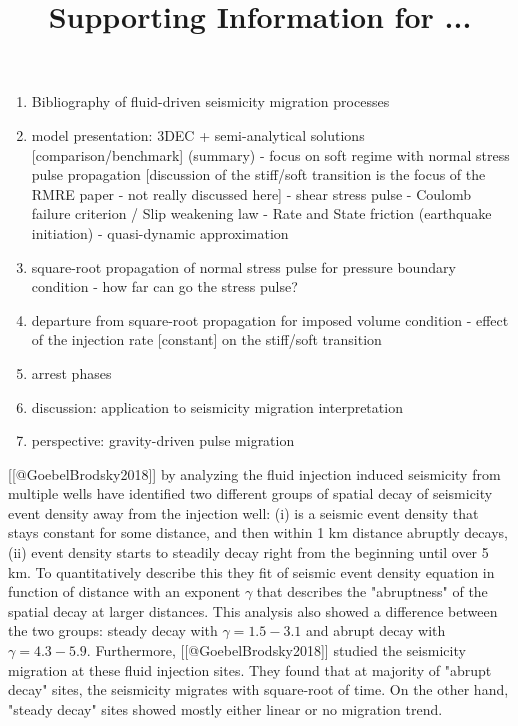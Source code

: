 \documentclass[draft,jgrga]{agutexSI2019}
\begin{document}
\title{Supporting Information for ...}

\authors{}










%
%



\begin{article}

\begin{enumerate}

        \item Bibliography of fluid-driven seismicity migration processes
    \item model presentation: 3DEC + semi-analytical solutions [comparison/benchmark] (summary) - focus on soft regime with normal stress pulse propagation [discussion of the stiff/soft transition is the focus of the RMRE paper - not really discussed here] - shear stress pulse -  Coulomb failure criterion / Slip weakening law - Rate and State friction (earthquake initiation) - quasi-dynamic approximation 
    \item square-root propagation of normal stress pulse for pressure boundary condition - how far can go the stress pulse?
    \item departure from square-root propagation for imposed volume condition - effect of the injection rate [constant] on the stiff/soft transition
    \item arrest phases
    \item discussion: application to seismicity migration interpretation
    \item perspective: gravity-driven pulse migration
\end{enumerate}


[[@GoebelBrodsky2018]] by analyzing the fluid injection induced seismicity from multiple wells have identified two different groups of spatial decay of seismicity event density away from the injection well: (i) is a seismic event density that stays constant for some distance, and then within 1 km distance abruptly decays, (ii) event density starts to steadily decay right from the beginning until over 5 km. To quantitatively describe this they fit of seismic event density equation in function of distance with an exponent $\gamma$ that describes the "abruptness" of the spatial decay at larger distances. This analysis also showed a difference between the two groups: steady decay with $\gamma=1.5-3.1$ and abrupt decay with $\gamma=4.3-5.9$. Furthermore, [[@GoebelBrodsky2018]] studied the seismicity migration at these fluid injection sites. They found that at majority of "abrupt decay" sites, the seismicity migrates with square-root of time. On the other hand, "steady decay" sites showed mostly either linear or no migration trend. 


\end{article}
\end{document}
